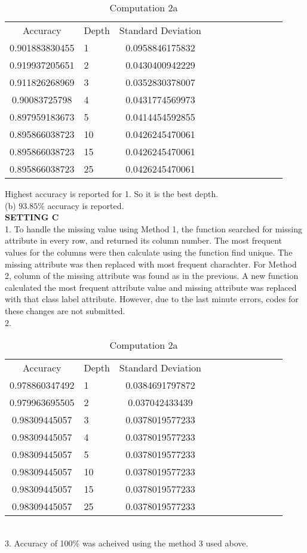 \documentclass{article}
\begin{document}
\begin{table}[h]
\centering
\caption{Computation 2a}
\begin{tabular} {clclclclclc}
Accuracy & Depth & Standard Deviation \\
0.901883830455 & 1 & 0.0958846175832 \\
0.919937205651 & 2 & 0.0430400942229 \\
0.911826268969 & 3 & 0.0352830378007 \\
0.90083725798 & 4 & 0.0431774569973 \\
0.897959183673 & 5 & 0.0414454592855 \\
0.895866038723 & 10 & 0.0426245470061 \\
0.895866038723 & 15 & 0.0426245470061 \\
0.895866038723 & 25 & 0.0426245470061 \\
  \end{tabular}
\end{table}
Highest accuracy is reported for 1. So it is the best depth.
\\(b) $93.85\%$ accuracy is reported.
\\[30pt]
\textbf {SETTING C}\\
1. To handle the missing value using Method 1, the function searched for missing attribute in every row, and returned its column number. The most frequent values for the columns were then calculate using the function find unique. The missing attribute was then replaced with most frequent charachter. For Method 2, column of the missing attribute was found as in the previous. A new function calculated the most frequent attribute value and missing attribute was replaced with that class label attribute. However, due to the last minute errors, codes for these changes are not submitted.
\\2. 
\begin{table}[h]
\centering
\caption{Computation 2a}
\begin{tabular} {clclclclclc}
Accuracy & Depth & Standard Deviation \\
0.978860347492 & 1 & 0.0384691797872 \\
0.979963695505 & 2 & 0.037042433439 \\
0.98309445057 & 3 & 0.0378019577233 \\
0.98309445057 & 4 & 0.0378019577233 \\
0.98309445057 & 5 & 0.0378019577233 \\ 
0.98309445057 & 10 & 0.0378019577233 \\ 
0.98309445057 & 15 & 0.0378019577233 \\
0.98309445057 & 25 & 0.0378019577233 \\
  \end{tabular}
\end{table}
\\3. Accuracy of 100\% was acheived using the method 3 used above.
\end{document}

